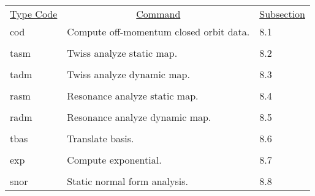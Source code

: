 \begin{center}
\begin{tabular}{lll}
\multicolumn{1}{c}{\underline {Type Code}} &
\multicolumn{1}{c}{\underline{Command}}   &
\multicolumn{1}{c}{\underline{Subsection}} \\
\hspace{1.5em}cod     &   Compute off-momentum closed orbit data.  & \hspace{2em}8.1\\
\vspace{-3mm}& &\\
\hspace{1.5em}tasm    &           Twiss analyze static map.      &  \hspace{2em}8.2\\
\vspace{-3mm}& &\\
\hspace{1.5em}tadm    &           Twiss analyze dynamic map.     &  \hspace{2em}8.3\\
\vspace{-3mm}& &\\
\hspace{1.5em}rasm    &           Resonance analyze static map.  &  \hspace{2em}8.4\\
\vspace{-3mm}& &\\
\hspace{1.5em}radm    &           Resonance analyze dynamic map. &  \hspace{2em}8.5\\
\vspace{-3mm}& &\\
\hspace{1.5em}tbas    &           Translate basis.               &  \hspace{2em}8.6\\
\vspace{-3mm}& &\\
\hspace{1.5em}exp     &           Compute exponential.           &  \hspace{2em}8.7\\
\vspace{-3mm}& &\\
\hspace{1.5em}snor    &           Static normal form analysis.   &  \hspace{2em}8.8\\

\end{tabular}
\end{center}
